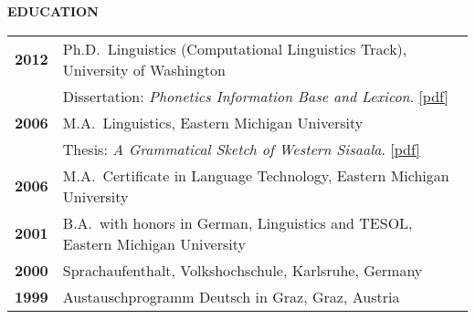 \documentclass[11pt]{article}
\newcommand{\hangpara}{
 \setlength{\parindent}{0in} %
 \hangindent=0.42in %
}
\begin{document}
\vskip 24pt
\begin{flushleft}
{\bf EDUCATION}
\end{flushleft}
\begin{tabular}{ll}
\bf 2012 & Ph.D.\ Linguistics (Computational Linguistics Track), University of Washington \\
& Dissertation: \textit{Phonetics Information Base and Lexicon}. \href{https://digital.lib.washington.edu/researchworks/handle/1773/22452}{[pdf]} \\
\bf 2006 & M.A.\ Linguistics, Eastern Michigan University \\
& Thesis: {\it A Grammatical Sketch of Western Sisaala}. \href{http://commons.emich.edu/theses/73/}{[pdf]}\\
\bf 2006 & M.A.\ Certificate in Language Technology, Eastern Michigan University \\
\bf 2001 & B.A.\ with honors in German, Linguistics and TESOL, Eastern Michigan University \\
\bf 2000 & Sprachaufenthalt, Volkshochschule, Karlsruhe, Germany \\
\bf 1999 & Austauschprogramm Deutsch in Graz, Graz, Austria \\
\end{tabular}

\begin{comment}
\vskip 24pt
\begin{flushleft}
{\bf EDUCATION}
\end{flushleft}
\begin{tabular}{lll}
\bf 2012 & University of Washington &  Ph.D.\ in Linguistics (Computational Linguistics Track) \\
\bf 2006 & Eastern Michigan University &  M.A.\ in Linguistics \\
\bf 2006 & Eastern Michigan University &  M.A.\ Certificate in Language Technology \\
\bf 2001 & Eastern Michigan University &  B.A.\ with honors in German, Linguistics and TESOL \\
\bf 2000 & Volkshochschule, Karlsruhe, Germany & Sprachaufenthalt \\
\bf 1999 & Deutsch in Graz, Graz, Austria & Austauschprogramm \\
\end{tabular}
\end{comment}

\begin{comment}
\vskip 6pt
\hangpara
{\bf 2012}\hspace{1ex}Moran, Steven. {\it Phonetics Information Base and Lexicon}. Ph.D.\ thesis, University of Washington. \url{https://digital.lib.washington.edu/researchworks/handle/1773/22452}

\vskip 6pt
\hangpara
{\bf 2006}\hspace{1ex}Moran, Steven. {\it A Grammatical Sketch of Western Sisaala}. M.A.\ thesis, Eastern Michigan University. \url{http://commons.emich.edu/theses/73/}
\end{comment}
\end{document}
